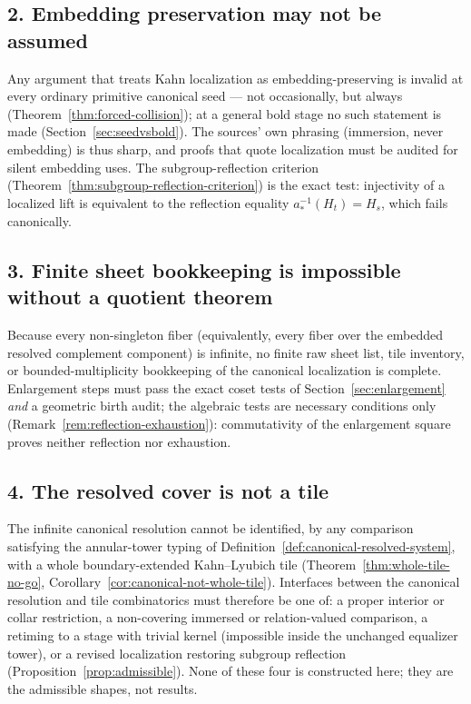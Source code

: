 \documentclass[11pt,reqno]{amsart}
\theoremstyle{definition}
\theoremstyle{remark}
\begin{document}
\subsection*{2. Embedding preservation may not be assumed}
Any argument that treats Kahn localization as embedding-preserving is
invalid at every ordinary primitive canonical seed --- not occasionally,
but always (Theorem~\ref{thm:forced-collision}); at a general bold
stage no such statement is made
(Section~\ref{sec:seedvsbold}).  The sources' own
phrasing (immersion, never embedding) is thus sharp, and proofs that
quote localization must be audited for silent embedding uses.  The
subgroup-reflection criterion (Theorem~\ref{thm:subgroup-reflection-criterion})
is the exact test: injectivity of a localized lift is equivalent to the
reflection equality $a_{*}^{-1}(H_{t})=H_{s}$, which fails canonically.

\subsection*{3. Finite sheet bookkeeping is impossible without a quotient theorem}
Because every non-singleton fiber (equivalently, every fiber over the
embedded resolved complement component) is infinite, no finite raw
sheet list,
tile inventory, or bounded-multiplicity bookkeeping of the canonical
localization is complete.  Enlargement steps must pass the exact coset
tests of Section~\ref{sec:enlargement} \emph{and} a geometric
birth audit; the algebraic tests are necessary conditions only
(Remark~\ref{rem:reflection-exhaustion}): commutativity of the
enlargement square proves neither reflection nor exhaustion.

\subsection*{4. The resolved cover is not a tile}
The infinite canonical resolution cannot be identified, by any
comparison satisfying the annular-tower typing of
Definition~\ref{def:canonical-resolved-system}, with a whole
boundary-extended Kahn--Lyubich tile
(Theorem~\ref{thm:whole-tile-no-go},
Corollary~\ref{cor:canonical-not-whole-tile}).  Interfaces between the
canonical resolution and tile combinatorics must therefore be one of:
a proper interior or collar restriction, a non-covering immersed or
relation-valued comparison, a retiming to a stage with trivial kernel
(impossible inside the unchanged equalizer tower), or a revised
localization restoring subgroup reflection
(Proposition~\ref{prop:admissible}).  None of these four is
constructed here; they are the admissible shapes, not results.
\end{document}
